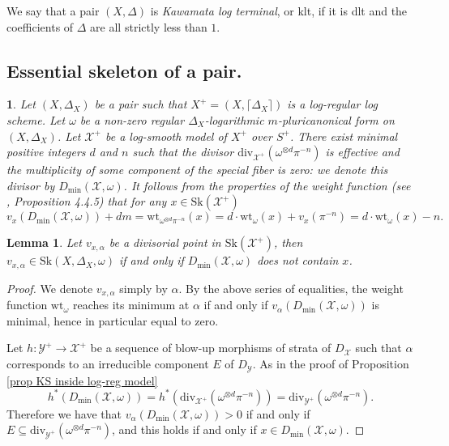 \documentclass{amsart}%
\numberwithin{equation}{subsection}
\theoremstyle{plain2}
\newtheorem{lemma}[equation]{Lemma}
\theoremstyle{definition2}
\theoremstyle{stepstyle}
\theoremstyle{point}
\theoremstyle{subpoint}
\newtheorem{subpoint}[equation]{}%
\newcommand{\spa}[1]{\begin{subpoint}#1\end{subpoint}}           %
\newcommand{\cX}{\ensuremath{\mathscr{X}}}
\newcommand{\cY}{\ensuremath{\mathscr{Y}}}
\renewcommand{\cY}{\ensuremath{\mathscr{Y}}}
\newcommand{\divisor}{\mathrm{div}}
\newcommand{\weight}{\mathrm{wt}}
\newcommand{\Sk}{\mathrm{Sk}}
\begin{document}
We say that a pair $(X,\Delta)$ is \emph{Kawamata log terminal}, or klt, if it is dlt and the coefficients of $\Delta$ are all strictly less than $1$.

\subsection{Essential skeleton of a pair.}
\spa{Let $(X,\Delta_X)$ be a pair such that $X^+=(X,\lceil \Delta_X \rceil)$ is a log-regular log scheme. Let $\omega$ be a non-zero regular $\Delta_X$-logarithmic $m$-pluricanonical form on $(X,\Delta_X)$. Let $\cX^+$ be a log-smooth model of $X^+$ over $S^+$. There exist minimal positive integers $d$ and $n$ such that the divisor $\divisor_{\cX^+}(\omega^{\otimes d} \pi^{-n})$ is effective and the multiplicity of some component of the special fiber is zero: we denote this divisor by $D_{\min}(\cX,\omega)$. It follows from the properties of the weight function (see \cite{MustataNicaise}, Proposition 4.4.5) that for any $x \in \Sk(\cX^+)$ $$v_x(D_{\min}(\cX,\omega)) + dm = \weight_{\omega^{\otimes d}\pi^{-n}}(x)= d \cdot \weight_{\omega}(x) + v_x(\pi^{-n}) = d \cdot \weight_{\omega}(x) -n.$$
}
\begin{lemma} \label{lemma characterization minimal points}
Let $v_{x,\alpha}$ be a divisorial point in $\Sk(\cX^+)$, then $v_{x,\alpha} \in \Sk(X,\Delta_X, \omega)$ if and only if $D_{\min}(\cX,\omega)$ does not contain $x$.
\end{lemma}
\begin{proof}
We denote $v_{x,\alpha}$ simply by $\alpha$. By the above series of equalities, the weight function $\weight_{\omega}$ reaches its minimum at $\alpha$ if and only if $v_\alpha(D_{\min}(\cX,\omega))$ is minimal, hence in particular equal to zero.

Let $h: \cY^+ \rightarrow \cX^+$ be a sequence of blow-up morphisms of strata of $D_\cX$ such that $\alpha$ corresponds to an irreducible component $E$ of $D_\cY$. As in the proof of Proposition \ref{prop KS inside log-reg model} $$h^*(D_{\min}(\cX,\omega))=h^*(\divisor_{\cX^+} (\omega^{\otimes d} \pi^{-n}))= \divisor_{\cY^+} (\omega^{\otimes d} \pi^{-n}).$$ Therefore we have that $v_\alpha(D_{\min}(\cX,\omega)) >0$ if and only if $E \subseteq \divisor_{\cY^+} (\omega^{\otimes d} \pi^{-n})$, and this holds if and only if $x \in D_{\min}(\cX,\omega)$.
\end{proof}
\end{document}
